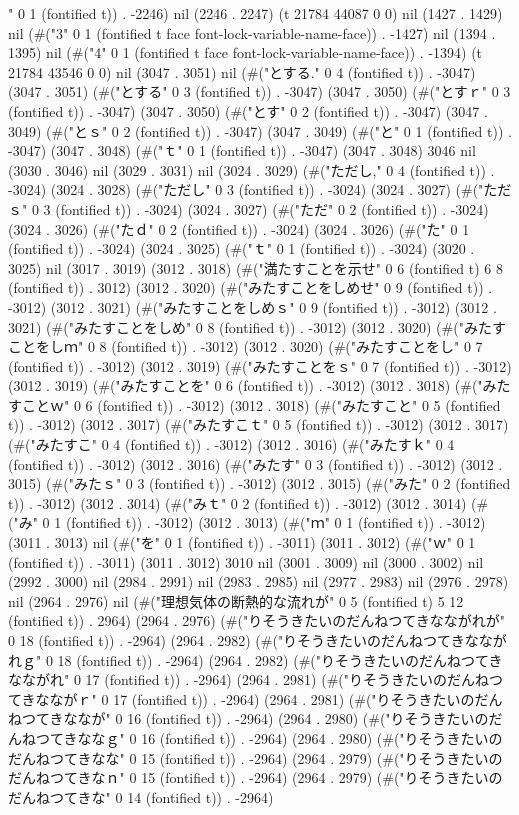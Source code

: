 {{" 0 1 (fontified t)) . -2246) nil (2246 . 2247) (t 21784 44087 0 0) nil (1427 . 1429) nil (#("3" 0 1 (fontified t face font-lock-variable-name-face)) . -1427) nil (1394 . 1395) nil (#("4" 0 1 (fontified t face font-lock-variable-name-face)) . -1394) (t 21784 43546 0 0) nil (3047 . 3051) nil (#("とする." 0 4 (fontified t)) . -3047) (3047 . 3051) (#("とする" 0 3 (fontified t)) . -3047) (3047 . 3050) (#("とすｒ" 0 3 (fontified t)) . -3047) (3047 . 3050) (#("とす" 0 2 (fontified t)) . -3047) (3047 . 3049) (#("とｓ" 0 2 (fontified t)) . -3047) (3047 . 3049) (#("と" 0 1 (fontified t)) . -3047) (3047 . 3048) (#("ｔ" 0 1 (fontified t)) . -3047) (3047 . 3048) 3046 nil (3030 . 3046) nil (3029 . 3031) nil (3024 . 3029) (#("ただし," 0 4 (fontified t)) . -3024) (3024 . 3028) (#("ただし" 0 3 (fontified t)) . -3024) (3024 . 3027) (#("ただｓ" 0 3 (fontified t)) . -3024) (3024 . 3027) (#("ただ" 0 2 (fontified t)) . -3024) (3024 . 3026) (#("たｄ" 0 2 (fontified t)) . -3024) (3024 . 3026) (#("た" 0 1 (fontified t)) . -3024) (3024 . 3025) (#("ｔ" 0 1 (fontified t)) . -3024) (3020 . 3025) nil (3017 . 3019) (3012 . 3018) (#("満たすことを示せ" 0 6 (fontified t) 6 8 (fontified t)) . 3012) (3012 . 3020) (#("みたすことをしめせ" 0 9 (fontified t)) . -3012) (3012 . 3021) (#("みたすことをしめｓ" 0 9 (fontified t)) . -3012) (3012 . 3021) (#("みたすことをしめ" 0 8 (fontified t)) . -3012) (3012 . 3020) (#("みたすことをしｍ" 0 8 (fontified t)) . -3012) (3012 . 3020) (#("みたすことをし" 0 7 (fontified t)) . -3012) (3012 . 3019) (#("みたすことをｓ" 0 7 (fontified t)) . -3012) (3012 . 3019) (#("みたすことを" 0 6 (fontified t)) . -3012) (3012 . 3018) (#("みたすことｗ" 0 6 (fontified t)) . -3012) (3012 . 3018) (#("みたすこと" 0 5 (fontified t)) . -3012) (3012 . 3017) (#("みたすこｔ" 0 5 (fontified t)) . -3012) (3012 . 3017) (#("みたすこ" 0 4 (fontified t)) . -3012) (3012 . 3016) (#("みたすｋ" 0 4 (fontified t)) . -3012) (3012 . 3016) (#("みたす" 0 3 (fontified t)) . -3012) (3012 . 3015) (#("みたｓ" 0 3 (fontified t)) . -3012) (3012 . 3015) (#("みた" 0 2 (fontified t)) . -3012) (3012 . 3014) (#("みｔ" 0 2 (fontified t)) . -3012) (3012 . 3014) (#("み" 0 1 (fontified t)) . -3012) (3012 . 3013) (#("ｍ" 0 1 (fontified t)) . -3012) (3011 . 3013) nil (#("を" 0 1 (fontified t)) . -3011) (3011 . 3012) (#("ｗ" 0 1 (fontified t)) . -3011) (3011 . 3012) 3010 nil (3001 . 3009) nil (3000 . 3002) nil (2992 . 3000) nil (2984 . 2991) nil (2983 . 2985) nil (2977 . 2983) nil (2976 . 2978) nil (2964 . 2976) nil (#("理想気体の断熱的な流れが" 0 5 (fontified t) 5 12 (fontified t)) . 2964) (2964 . 2976) (#("りそうきたいのだんねつてきなながれが" 0 18 (fontified t)) . -2964) (2964 . 2982) (#("りそうきたいのだんねつてきなながれｇ" 0 18 (fontified t)) . -2964) (2964 . 2982) (#("りそうきたいのだんねつてきなながれ" 0 17 (fontified t)) . -2964) (2964 . 2981) (#("りそうきたいのだんねつてきなながｒ" 0 17 (fontified t)) . -2964) (2964 . 2981) (#("りそうきたいのだんねつてきななが" 0 16 (fontified t)) . -2964) (2964 . 2980) (#("りそうきたいのだんねつてきななｇ" 0 16 (fontified t)) . -2964) (2964 . 2980) (#("りそうきたいのだんねつてきなな" 0 15 (fontified t)) . -2964) (2964 . 2979) (#("りそうきたいのだんねつてきなｎ" 0 15 (fontified t)) . -2964) (2964 . 2979) (#("りそうきたいのだんねつてきな" 0 14 (fontified t)) . -2964) }}
